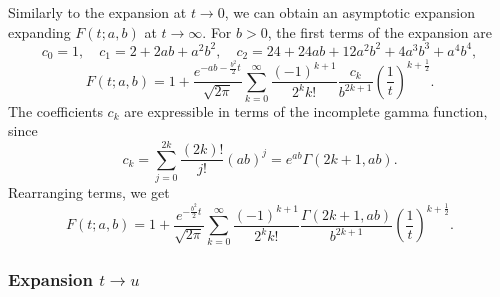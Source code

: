 \documentclass[10pt,a4paper,oneside]{article}
\numberwithin{equation}{section}
\begin{document}
Similarly to the expansion at $t \to 0$, we can obtain an asymptotic expansion expanding $F(t; a, b)$ at $t \to \infty$. For $b > 0$, the first terms of the expansion are
\begin{equation}
c_0 = 1, \quad c_1 = 2 + 2ab + a^2 b^2, \quad c_2 = 24 + 24ab + 12a^2b^2 + 4a^3b^3 + a^4b^4,
\end{equation}
\begin{equation}
F(t; a, b) = 1 + \frac{e^{-ab - \frac{b^2}{2}t}}{\sqrt{2\pi}}\sum_{k=0}^{\infty}\frac{(-1)^{k+1}}{2^k k!}\frac{c_k}{b^{2k+1}}\left(\frac{1}{t}\right)^{k+\frac{1}{2}}.
\end{equation}
The coefficients $c_k$ are expressible in terms of the incomplete gamma function, since
\begin{equation*}
c_k = \sum_{j=0}^{2k}\frac{(2k)!}{j!}(ab)^j = e^{ab}\Gamma(2k+1, ab).
\end{equation*}
Rearranging terms, we get
\begin{equation}
F(t; a, b) = 1 + \frac{e^{- \frac{b^2}{2}t}}{\sqrt{2\pi}}\sum_{k=0}^{\infty}\frac{(-1)^{k+1}}{2^k k!}\frac{\Gamma(2k+1, ab)}{b^{2k+1}}\left(\frac{1}{t}\right)^{k+\frac{1}{2}}.
\end{equation}

\subsubsection{Expansion $t \to u$}
\end{document}
